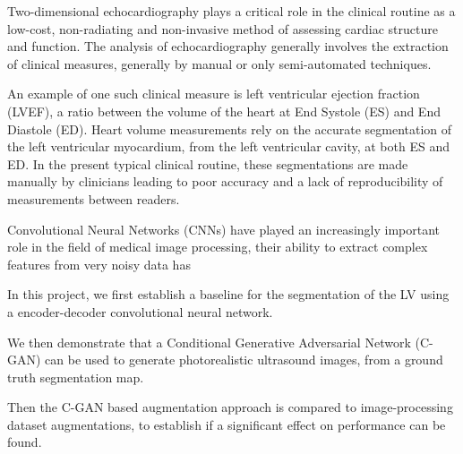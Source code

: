 Two-dimensional echocardiography plays a critical role in the clinical routine
as a low-cost, non-radiating and non-invasive method of assessing cardiac
structure and function. The analysis of echocardiography generally involves the
extraction of clinical measures, generally by manual or only semi-automated
techniques. \newline

An example of one such clinical measure is left ventricular ejection fraction
(LVEF), a ratio between the volume of the heart at End Systole (ES) and End
Diastole (ED). Heart volume measurements rely on the accurate segmentation of
the left ventricular myocardium, from the left ventricular cavity, at both ES
and ED. In the present typical clinical routine, these segmentations are made
manually by clinicians leading to poor accuracy and a lack of reproducibility of
measurements between readers. \newline

Convolutional Neural Networks (CNNs) have played an increasingly important role
in the field of medical image processing, their ability to extract complex
features from very noisy data has 

In this project, we first establish a baseline for the segmentation of the LV using a
encoder-decoder convolutional neural network. \newline

We then demonstrate that a Conditional Generative Adversarial Network (C-GAN)
can be used to generate photorealistic ultrasound images, from a ground truth
segmentation map. \newline

Then the C-GAN based augmentation approach is compared to image-processing
dataset augmentations, to establish if a significant effect on performance can
be found.